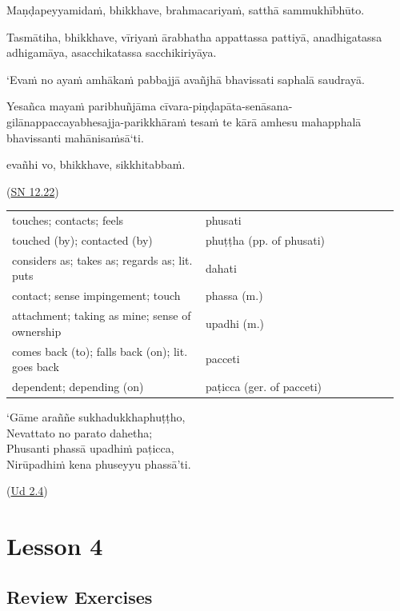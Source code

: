 \documentclass[11pt,oneside]{memoir}
\begin{document}
{\raggedright

Maṇḍapeyyamidaṁ, bhikkhave, brahmacariyaṁ, satthā sammukhībhūto.

Tasmātiha, bhikkhave, vīriyaṁ ārabhatha appattassa pattiyā, anadhigatassa
adhigamāya, asacchikatassa sacchikiriyāya.

`Evaṁ no ayaṁ amhākaṁ pabbajjā avañjhā bhavissati saphalā saudrayā.

Yesañca mayaṁ paribhuñjāma
cīvara-piṇḍapāta-senāsana-gilānappaccayabhesajja-parikkhāraṁ tesaṁ te kārā
amhesu mahapphalā bhavissanti mahānisaṁsā`ti.

evañhi vo, bhikkhave, sikkhitabbaṁ.

(\href{https://suttacentral.net/sn12.22/en/sujato}{SN 12.22})

\par}

\bigskip

\begin{longtable}{L{0.48\linewidth} L{0.48\linewidth}}
touches; contacts; feels & phusati\\[0pt]
touched (by); contacted (by) & phuṭṭha (pp. of phusati)\\[0pt]
considers as; takes as; regards as; lit. puts & dahati\\[0pt]
contact; sense impingement; touch & phassa (m.)\\[0pt]
attachment; taking as mine; sense of ownership & upadhi (m.)\\[0pt]
comes back (to); falls back (on); lit. goes back & pacceti\\[0pt]
dependent; depending (on) & paṭicca (ger. of pacceti)\\[0pt]
\end{longtable}

\bigskip

`Gāme araññe sukhadukkhaphuṭṭho, \\[0pt]
Nevattato no parato dahetha; \\[0pt]
Phusanti phassā upadhiṁ paṭicca, \\[0pt]
Nirūpadhiṁ kena phuseyyu phassā'ti.

(\href{https://suttacentral.net/ud2.4/pli/ms}{Ud 2.4})

\chapter{Lesson 4}
\label{sec:orgc3187f4}
\section{Review Exercises}
\label{sec:org16a9647}
\end{document}
